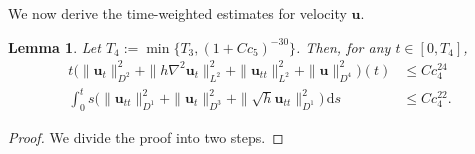 \documentclass[11pt,reqno]{amsart}
\newtheorem{lem}{Lemma}[section]
\numberwithin{rk}{section}
\numberwithin{prop}{section}
\numberwithin{mydef}{section}
\numberwithin{lem}{section}
\numberwithin{equation}{section}
\numberwithin{thm}{section}
\begin{document}
 
We now derive the time-weighted estimates for velocity $\boldsymbol{u}$.
\begin{lem}\label{hu2}
Let $T_4:=\min\{T_3,(1+Cc_5)^{-30}\}$. Then, for any $t\in [0,T_4]$, 
\begin{equation*} 
\begin{aligned}
t\big(\|\boldsymbol{u}_t\|^2_{D^2}+\|h\nabla^2\boldsymbol{u}_t\|^2_{L^2}+ \|\boldsymbol{u}_{tt}\|^2_{L^2}+ \|\boldsymbol{u}\|^2_{D^4}\big)(t)&\leq  Cc^{24}_4\\
\int^t_0s\big(\|\boldsymbol{u}_{tt}\|_{D^1}^2+\|\boldsymbol{u}_t\|^2_{D^3}+\|\sqrt{h} \boldsymbol{u}_{tt}\|_{D^1}^2\big)\,\mathrm{d}s &\leq  Cc^{22}_4.
\end{aligned}
\end{equation*}
\end{lem}
\begin{proof}
We divide the proof into two steps.


\end{proof}
\end{document}
